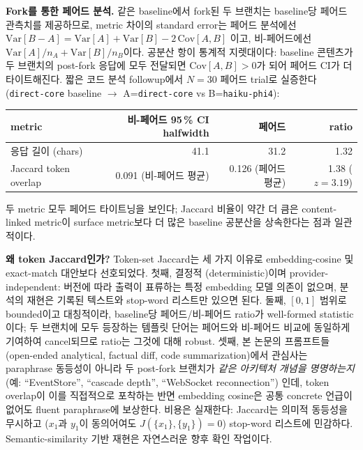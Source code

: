 \documentclass[11pt,a4paper]{article}
\begin{document}
\textbf{Fork를 통한 페어드 분석.} 같은 baseline에서 fork된 두 브랜치는
baseline당 페어드 관측치를 제공하므로, metric 차이의 standard error는
페어드 분석에선
$\mathrm{Var}[B-A] = \mathrm{Var}[A] + \mathrm{Var}[B] - 2\,\mathrm{Cov}[A,B]$
이고, 비-페어드에선
$\mathrm{Var}[A]/n_A + \mathrm{Var}[B]/n_B$이다. 공분산 항이 통계적
지렛대이다: baseline 콘텐츠가 두 브랜치의 post-fork 응답에 모두 전달되면
$\mathrm{Cov}[A,B] > 0$가 되어 페어드 CI가 더 타이트해진다. 짧은 코드
분석 followup에서 $N=30$ 페어드 trial로 실증한다
(\texttt{direct-core} baseline $\to$ A=\texttt{direct-core} vs
B=\texttt{haiku-phi4}):

\begin{table}[H]
\centering\small
\begin{tabular}{l r r r}
\toprule
metric & 비-페어드 95\,\% CI halfwidth & 페어드 & ratio \\
\midrule
응답 길이 (chars) & 41.1 & 31.2 & 1.32 \\
Jaccard token overlap & 0.091 (비-페어드 평균) & 0.126 (페어드 평균) & 1.38 ($z=3.19$) \\
\bottomrule
\end{tabular}
\end{table}

두 metric 모두 페어드 타이트닝을 보인다; Jaccard 비율이 약간 더 큼은
content-linked metric이 surface metric보다 더 많은 baseline 공분산을
상속한다는 점과 일관적이다.

\textbf{왜 token Jaccard인가?} Token-set Jaccard는 세 가지 이유로
embedding-cosine 및 exact-match 대안보다 선호되었다. 첫째, 결정적
(deterministic)이며 provider-independent: 버전에 따라 출력이 표류하는
특정 embedding 모델 의존이 없으며, 분석의 재현은 기록된 텍스트와
stop-word 리스트만 있으면 된다. 둘째, $[0,1]$ 범위로 bounded이고
대칭적이라, baseline당 페어드/비-페어드 ratio가 well-formed statistic
이다; 두 브랜치에 모두 등장하는 템플릿 단어는 페어드와 비-페어드
비교에 동일하게 기여하여 cancel되므로 ratio는 그것에 대해 robust.
셋째, 본 논문의 프롬프트들 (open-ended analytical, factual diff,
code summarization)에서 관심사는 paraphrase 동등성이 아니라 두
post-fork 브랜치가 \emph{같은 아키텍처 개념을 명명하는지}
(예: ``EventStore'', ``cascade depth'', ``WebSocket reconnection'')
인데, token overlap이 이를 직접적으로 포착하는 반면 embedding cosine은
공통 concrete 언급이 없어도 fluent paraphrase에 보상한다. 비용은
실재한다: Jaccard는 의미적 동등성을 무시하고 ($x_1$과 $y_1$이
동의어여도 $J(\{x_1\}, \{y_1\}) = 0$) stop-word 리스트에 민감하다.
Semantic-similarity 기반 재현은 자연스러운 향후 확인 작업이다.
\end{document}
